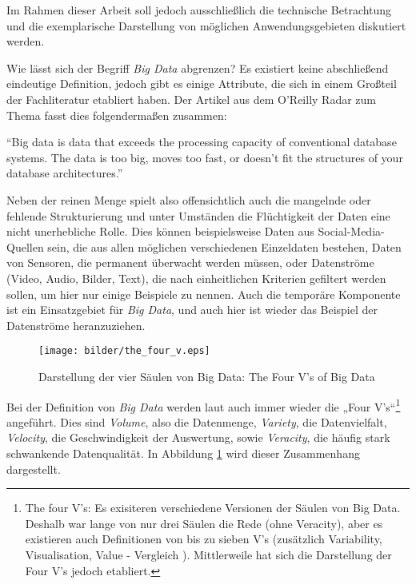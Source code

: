 Im Rahmen dieser Arbeit soll jedoch ausschließlich die technische Betrachtung und die exemplarische Darstellung von möglichen Anwendungsgebieten diskutiert werden.




Wie lässt sich der Begriff \textit{Big Data} abgrenzen? Es existiert keine abschließend eindeutige Definition, jedoch gibt es einige Attribute, die sich in einem Großteil der Fachliteratur etabliert haben. Der Artikel aus dem O'Reilly Radar zum Thema  fasst dies folgendermaßen zusammen: 

\enquote{Big data is data that exceeds the processing capacity of conventional database systems. The data is too big, moves too fast, or doesn’t fit the structures of your database architectures.}

Neben der reinen Menge spielt also offensichtlich auch die mangelnde oder fehlende Strukturierung und unter Umständen die Flüchtigkeit der Daten eine nicht unerhebliche Rolle. Dies können beispielsweise Daten aus Social-Media-Quellen sein, die aus allen möglichen verschiedenen Einzeldaten bestehen, Daten von Sensoren, die permanent überwacht werden müssen, oder Datenströme (Video, Audio, Bilder, Text), die nach einheitlichen Kriterien gefiltert werden sollen, um hier nur einige Beispiele zu nennen. Auch die temporäre Komponente ist ein Einsatzgebiet für \textit{Big Data}, und auch hier ist wieder das Beispiel der Datenströme heranzuziehen. 

\begin{figure}[htb!]
\centering
\texttt{[image: bilder/the\_four\_v.eps]}
\caption{Darstellung der vier Säulen von Big Data: The Four V's of Big Data}
\label{fig:fourv}
\end{figure}    

Bei der Definition von \textit{Big Data} werden laut  auch immer wieder die „Four V's“\footnote{The four V's: Es exisiteren verschiedene Versionen der Säulen von Big Data. Deshalb war lange von nur drei Säulen die Rede (ohne Veracity), aber es existieren auch Definitionen von bis zu sieben V's (zusätzlich Variability, Visualisation, Value - Vergleich ). Mittlerweile hat sich die Darstellung der Four V's jedoch etabliert.} angeführt. Dies sind \textit{Volume}, also die Datenmenge, \textit{Variety}, die Datenvielfalt,  \textit{Velocity}, die Geschwindigkeit der Auswertung, sowie \textit{Veracity}, die häufig stark schwankende Datenqualität. In Abbildung \ref{fig:fourv} wird dieser Zusammenhang dargestellt. 




